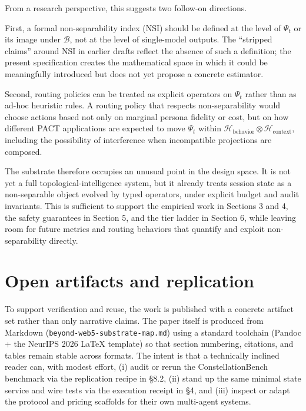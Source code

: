 From a research perspective, this suggests two follow-on directions.

First, a formal non-separability index (NSI) should be defined at the
level of \(\Psi_t\) or its image under \(\mathcal{B}\), not at the level
of single-model outputs. The ``stripped claims'' around NSI in earlier
drafts reflect the absence of such a definition; the present
specification creates the mathematical space in which it could be
meaningfully introduced but does not yet propose a concrete estimator.

Second, routing policies can be treated as explicit operators on
\(\Psi_t\) rather than as ad-hoc heuristic rules. A routing policy that
respects non-separability would choose actions based not only on
marginal persona fidelity or cost, but on how different PACT
applications are expected to move \(\Psi_t\) within
\(\mathcal{H}_{\text{behavior}} \otimes \mathcal{H}_{\text{context}}\),
including the possibility of interference when incompatible projections
are composed.

The substrate therefore occupies an unusual point in the design space.
It is not yet a full topological-intelligence system, but it already
treats session state as a non-separable object evolved by typed
operators, under explicit budget and audit invariants. This is
sufficient to support the empirical work in Sections 3 and 4, the safety
guarantees in Section 5, and the tier ladder in Section 6, while leaving
room for future metrics and routing behaviors that quantify and exploit
non-separability directly.

\section{Open artifacts and
replication}\label{open-artifacts-and-replication}

To support verification and reuse, the work is published with a concrete
artifact set rather than only narrative claims. The paper itself is
produced from Markdown (\texttt{beyond-web5-substrate-map.md}) using a
standard toolchain (Pandoc + the NeurIPS 2026 LaTeX template) so that
section numbering, citations, and tables remain stable across formats.
The intent is that a technically inclined reader can, with modest
effort, (i) audit or rerun the ConstellationBench benchmark via the
replication recipe in §8.2, (ii) stand up the same minimal state service
and wire tests via the execution receipt in §4, and (iii) inspect or
adapt the protocol and pricing scaffolds for their own multi-agent
systems.

